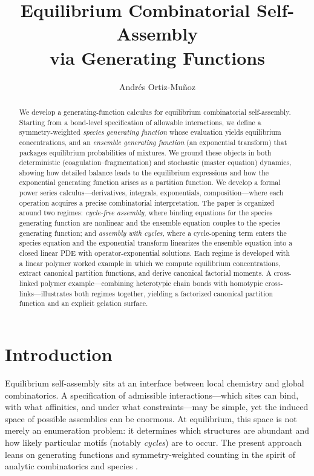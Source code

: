 \documentclass[11pt]{amsart}
\title{Equilibrium Combinatorial Self-Assembly \\ via Generating Functions}
\author{Andr\'es Ortiz-Mu\~{n}oz}
\date{}
\theoremstyle{definition}
\theoremstyle{plain}
\theoremstyle{remark}
\begin{document}
\begin{abstract}
We develop a generating-function calculus for equilibrium combinatorial self-assembly.
Starting from a bond-level specification of allowable interactions, we define a symmetry-weighted \emph{species generating function} whose evaluation yields equilibrium concentrations, and an \emph{ensemble generating function} (an exponential transform) that packages equilibrium probabilities of mixtures.
We ground these objects in both deterministic (coagulation--fragmentation) and stochastic (master equation) dynamics, showing how detailed balance leads to the equilibrium expressions and how the exponential generating function arises as a partition function.
We develop a formal power series calculus---derivatives, integrals, exponentials, composition---where each operation acquires a precise combinatorial interpretation.
The paper is organized around two regimes: \emph{cycle-free assembly}, where binding equations for the species generating function are nonlinear and the ensemble equation couples to the species generating function; and \emph{assembly with cycles}, where a cycle-opening term enters the species equation and the exponential transform linearizes the ensemble equation into a closed linear PDE with operator-exponential solutions.
Each regime is developed with a linear polymer worked example in which we compute equilibrium concentrations, extract canonical partition functions, and derive canonical factorial moments.
A cross-linked polymer example---combining heterotypic chain bonds with homotypic cross-links---illustrates both regimes together, yielding a factorized canonical partition function and an explicit gelation surface.
\end{abstract}

\maketitle


\section{Introduction}
\label{sec:intro}

Equilibrium self-assembly sits at an interface between local chemistry and global combinatorics.
A specification of admissible interactions---which sites can bind, with what affinities, and under what constraints---may be simple, yet the induced space of possible assemblies can be enormous.
At equilibrium, this space is not merely an enumeration problem: it determines which structures are abundant and how likely particular motifs (notably \emph{cycles}) are to occur.
The present approach leans on generating functions and symmetry-weighted counting in the spirit of analytic combinatorics and species \cite{flajolet2009analytic,joyal1981theorie,bergeron1998combinatorial}.
\end{document}
